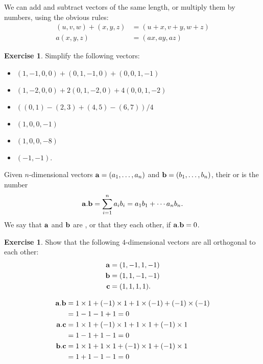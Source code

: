 \documentclass[a4paper]{book}
\theoremstyle{definition}
\newtheorem{exercise}[theorem]{Exercise}
\renewenvironment{solution}{\SolutionInline}{\endSolutionInline}
\begin{document}
We can add and subtract vectors of the same length, or multiply them
by numbers, using the obvious rules:
\begin{align*}
 (u,v,w) + (x,y,z) &= (u+x,v+y,w+z) \\
 a(x,y,z)          &= (ax,ay,az)
\end{align*}
\begin{exercise}
 Simplify the following vectors:
 \begin{itemize}
 \item $(1,-1,0,0)+(0,1,-1,0)+(0,0,1,-1)$
 \item $(1,-2,0,0)+2(0,1,-2,0)+4(0,0,1,-2)$
 \item $((0,1)-(2,3)+(4,5)-(6,7))/4$
 \end{itemize}
\end{exercise}
\begin{solution}
 \begin{itemize}
 \item $(1,0,0,-1)$
 \item $(1,0,0,-8)$
 \item $(-1,-1)$.
 \end{itemize}
\end{solution}


Given $n$-dimensional vectors $\mathbf{a}=(a_1,\dotsc,a_n)$ and
$\mathbf{b}=(b_1,\dotsc,b_n)$, their  or 
 is the number
\[ \mathbf{a}.\mathbf{b} = \sum_{i=1}^n a_ib_i = a_1b_1 + \dotsb a_nb_n. \]
We say that $\mathbf{a}$ and $\mathbf{b}$ are , or that
they  each other, if $\mathbf{a}.\mathbf{b}=0$.
\begin{exercise}
 Show that the following $4$-dimensional vectors are all orthogonal to
 each other:
 \begin{align*}
  \mathbf{a} &= (1,-1,1,-1) \\
  \mathbf{b} &= (1,1,-1,-1) \\
  \mathbf{c} &= (1,1,1,1).
 \end{align*}
\end{exercise}
\begin{solution}
 \begin{align*}
  \mathbf{a}.\mathbf{b} &= 1\times 1 + (-1)\times 1 + 1 \times (-1) + (-1)\times(-1) \\
                  &= 1 - 1 - 1 + 1 = 0 \\
  \mathbf{a}.\mathbf{c} &= 1\times 1 + (-1)\times 1 + 1 \times 1 + (-1)\times 1 \\
                  &= 1 - 1 + 1 - 1 = 0 \\
  \mathbf{b}.\mathbf{c} &= 1\times 1 + 1\times 1 + (-1) \times 1 + (-1)\times 1 \\
                  &= 1 + 1 - 1 - 1 = 0
 \end{align*}
\end{solution}
\end{document}

